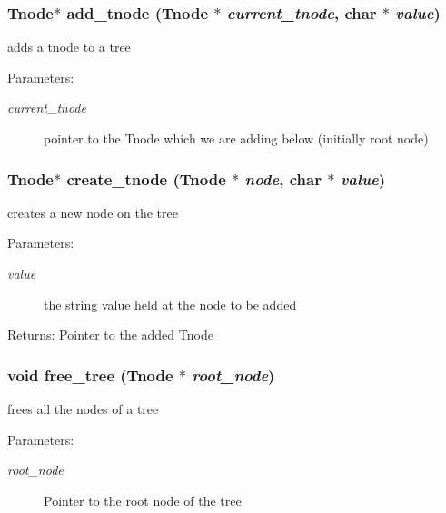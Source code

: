 \subsubsection{\setlength{\rightskip}{0pt plus 5cm}\bf{Tnode}$\ast$ add\_\-tnode (\bf{Tnode} $\ast$ {\em current\_\-tnode}, char $\ast$ {\em value})}\label{tnode_8h_0e09ab427d9f10182d2261a14b349f66}


adds a tnode to a tree \begin{Desc}
\item[Parameters:]
\begin{description}
\item[{\em current\_\-tnode}]pointer to the Tnode which we are adding below (initially root node) \end{description}
\end{Desc}
\subsubsection{\setlength{\rightskip}{0pt plus 5cm}\bf{Tnode}$\ast$ create\_\-tnode (\bf{Tnode} $\ast$ {\em node}, char $\ast$ {\em value})}\label{tnode_8h_da5f86089fe3823ec899b99e631d3c5f}


creates a new node on the tree \begin{Desc}
\item[Parameters:]
\begin{description}
\item[{\em value}]the string value held at the node to be added \end{description}
\end{Desc}
\begin{Desc}
\item[Returns:]Pointer to the added Tnode \end{Desc}
\subsubsection{\setlength{\rightskip}{0pt plus 5cm}void free\_\-tree (\bf{Tnode} $\ast$ {\em root\_\-node})}\label{tnode_8h_672b4a5d276720be5ec4fc3a21c0f5d7}


frees all the nodes of a tree \begin{Desc}
\item[Parameters:]
\begin{description}
\item[{\em root\_\-node}]Pointer to the root node of the tree \end{description}
\end{Desc}
